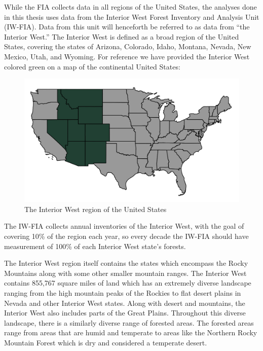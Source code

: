 \documentclass[12pt,twoside]{reedthesis}
\begin{document}
While the FIA collects data in all regions of the United States, the analyses done in this thesis uses data from the Interior West Forest Inventory and Analysis Unit (IW-FIA). Data from this unit will henceforth be referred to as data from ``the Interior West.'' The Interior West is defined as a broad region of the United States, covering the states of Arizona, Colorado, Idaho, Montana, Nevada, New Mexico, Utah, and Wyoming. For reference we have provided the Interior West colored green on a map of the continental United States:
\begin{figure}

{\centering \includegraphics[width=1\linewidth]{figure/interior-west-on-usa} 

}

\caption{The Interior West region of the United States}\label{fig:unnamed-chunk-3}
\end{figure}
The IW-FIA collects annual inventories of the Interior West, with the goal of covering 10\% of the region each year, so every decade the IW-FIA should have measurement of 100\% of each Interior West state's forests.

The Interior West region itself contains the states which encompass the Rocky Mountains along with some other smaller mountain ranges. The Interior West contains 855,767 square miles of land which has an extremely diverse landscape ranging from the high mountain peaks of the Rockies to flat desert plains in Nevada and other Interior West states. Along with desert and mountains, the Interior West also includes parts of the Great Plains. Throughout this diverse landscape, there is a similarly diverse range of forested areas. The forested areas range from areas that are humid and temperate to areas like the Northern Rocky Mountain Forest which is dry and considered a temperate desert.
\clearpage
\end{document}
